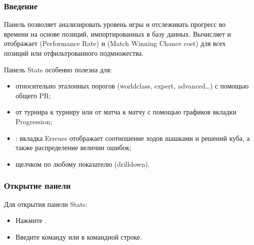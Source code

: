 \documentclass[letterpaper,10pt,russian]{sphinxmanual}
\begin{document}
\subsubsection{Введение}
\label{\detokenize{manuel:id9}}
\sphinxAtStartPar
Панель  позволяет анализировать уровень игры и отслеживать прогресс во времени на основе позиций, импортированных в базу данных. Вычисляет и отображает  (Performance Rate) и  (Match Winning Chance cost) для всех позиций или отфильтрованного подмножества.

\sphinxAtStartPar
Панель Stats особенно полезна для:
\begin{itemize}
\item {} 
\sphinxAtStartPar
{} относительно эталонных порогов (world\sphinxhyphen{}class, expert, advanced…) с помощью общего PR;

\item {} 
\sphinxAtStartPar
{} от турнира к турниру или от матча к матчу с помощью графиков вкладки Progression;

\item {} 
\sphinxAtStartPar
{}: вкладка Erreurs отображает соотношение ходов шашками и решений куба, а также распределение величин ошибок;

\item {} 
\sphinxAtStartPar
{} щелчком по любому показателю (drill\sphinxhyphen{}down).

\end{itemize}


\subsubsection{Открытие панели}
\label{\detokenize{manuel:ouverture-du-panneau}}
\sphinxAtStartPar
Для открытия панели Stats:
\begin{itemize}
\item {} 
\sphinxAtStartPar
Нажмите .

\item {} 
\sphinxAtStartPar
Введите команду  или  в командной строке.

\end{itemize}
\end{document}
